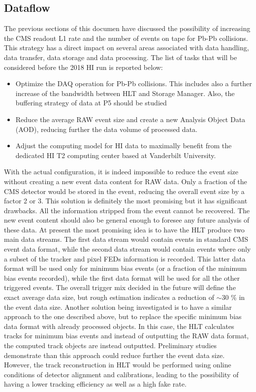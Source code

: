 \subsection{Dataflow\label{subsec:dataflow}} 
The previous sections of this documen have discussed the possibility of increasing the CMS readout L1 rate and the number of 
events on tape for Pb-Pb collisions. This strategy has a direct impact on several areas associated with data handling, 
data transfer, data storage and data processing. The
list of tasks that will be considered before the 2018 HI run is reported below:

\begin{itemize} \item Optimize the DAQ operation for Pb-Pb collisions. This includes also a further increase of the
bandwidth between HLT and Storage Manager. Also, the buffering strategy of data at P5 should be studied

\item Reduce the average RAW event size and create a new Analysis Object Data (AOD), reducing further the data volume of
processed data.

\item Adjust the computing model for HI data to maximally benefit from the dedicated HI T2 computing center based at
Vanderbilt University. \end{itemize}

With the actual configuration, it is indeed impossible to reduce the event size without creating a new
event data content for RAW data. Only a fraction of the CMS detector would be stored in the event, reducing the overall
event size by a factor 2 or 3. This solution is definitely the most promising but it has significant drawbacks. All the
information stripped from the event cannot be recovered. The new event content should also be general enough to foresee
any future analysis of these data. At present the most promising idea is to have the HLT produce two main data streams.
The first data stream would contain events in standard CMS event data format, while the second data stream would contain
events where only a subset of the tracker and pixel FEDs information is recorded. This latter data format will be used
only for minimum bias events (or a fraction of the minimum bias events recorded), while the first data format will be
used for all the other triggered events. The overall trigger mix decided in the future will define the exact average
data size, but rough estimation indicates a reduction of $\sim 30$ \% in the event data size. Another solution being
investigated is to have a similar approach to the one described above, but to replace the specific minimum bias data
format with already processed objects. In this case, the HLT calculates tracks for minimum bias events and instead of
outputting the RAW data format, the computed track objects are instead outputted. Preliminary studies demonstrate than
this approach could reduce further the event data size. However, the track reconstruction in HLT would be performed
using online conditions of detector alignment and calibrations, leading to the possibility of having a lower tracking
efficiency as well as a high fake rate.





